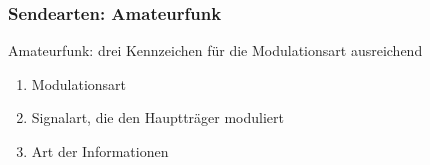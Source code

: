 \begin{frame}
    \frametitle{Sendearten: Amateurfunk}

    Amateurfunk: drei Kennzeichen für die Modulationsart ausreichend

    \begin{enumerate}
        \item Modulationsart
        \item Signalart, die den Hauptträger moduliert
        \item Art der Informationen
    \end{enumerate}


\end{frame}

